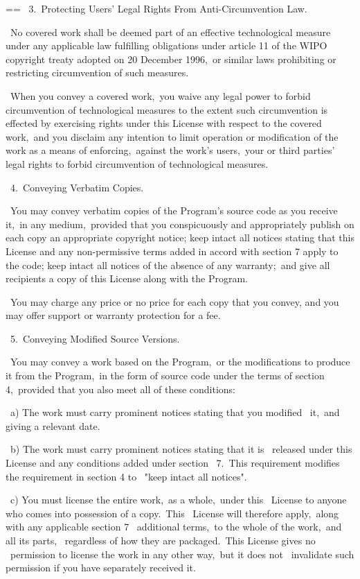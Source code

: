 \documentclass{book}
\makeatletter
\newenvironment{Texinfopreformatted}{%
  \par\GNUTobeylines\obeyspaces\frenchspacing\parskip=\z@\parindent=\z@}{}
{\catcode`\^^M=13 \gdef\GNUTobeylines{\catcode`\^^M=13 \def^^M{\null\par}}}
\newenvironment{Texinfoindented}{\begin{list}{}{}\item\relax}{\end{list}}
\renewcommand{\_}{\Texinfounderscore\discretionary{}{}{}}
\makeatother
\begin{document}
\begin{Texinfoindented}
\begin{Texinfopreformatted}
\  3.\ Protecting Users' Legal Rights From Anti-Circumvention Law.

\  No covered work shall be deemed part of an effective technological
measure under any applicable law fulfilling obligations under article
11 of the WIPO copyright treaty adopted on 20 December 1996,\ or
similar laws prohibiting or restricting circumvention of such
measures.

\  When you convey a covered work,\ you waive any legal power to forbid
circumvention of technological measures to the extent such circumvention
is effected by exercising rights under this License with respect to
the covered work,\ and you disclaim any intention to limit operation or
modification of the work as a means of enforcing,\ against the work's
users,\ your or third parties' legal rights to forbid circumvention of
technological measures.

\  4.\ Conveying Verbatim Copies.

\  You may convey verbatim copies of the Program's source code as you
receive it,\ in any medium,\ provided that you conspicuously and
appropriately publish on each copy an appropriate copyright notice;
keep intact all notices stating that this License and any
non-permissive terms added in accord with section 7 apply to the code;
keep intact all notices of the absence of any warranty;\ and give all
recipients a copy of this License along with the Program.

\  You may charge any price or no price for each copy that you convey,
and you may offer support or warranty protection for a fee.

\  5.\ Conveying Modified Source Versions.

\  You may convey a work based on the Program,\ or the modifications to
produce it from the Program,\ in the form of source code under the
terms of section 4,\ provided that you also meet all of these conditions:

\    a) The work must carry prominent notices stating that you modified
\    it,\ and giving a relevant date.

\    b) The work must carry prominent notices stating that it is
\    released under this License and any conditions added under section
\    7.\  This requirement modifies the requirement in section 4 to
\    "keep intact all notices".

\    c) You must license the entire work,\ as a whole,\ under this
\    License to anyone who comes into possession of a copy.\  This
\    License will therefore apply,\ along with any applicable section 7
\    additional terms,\ to the whole of the work,\ and all its parts,
\    regardless of how they are packaged.\  This License gives no
\    permission to license the work in any other way,\ but it does not
\    invalidate such permission if you have separately received it.


\end{Texinfopreformatted}
\end{Texinfoindented}
\end{document}
